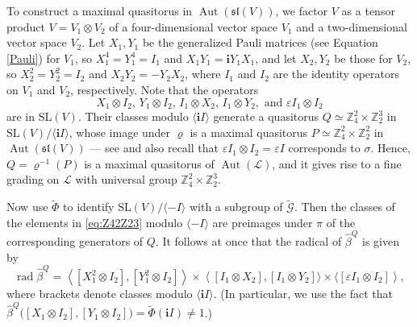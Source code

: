 \documentclass[a4paper,reqno]{amsart}
\theoremstyle{definition}
\numberwithin{theorem}{section}
\numberwithin{equation}{section}
\begin{document}
To construct a maximal quasitorus in $\operatorname{\mathrm{Aut}}({{\mathfrak{sl}}}(V))$, we factor $V$ as a tensor product $V=V_1\otimes V_2$ of a four-dimensional vector space $V_1$ and a two-dimensional vector space $V_2$. Let $X_1,Y_1$ be the generalized Pauli matrices (see Equation \eqref{Pauli}) for $V_1$, so $X_1^4=Y_1^4=I_1$ and $X_1Y_1={\mathbf{i}} Y_1X_1$, and let $X_2,Y_2$ be those for $V_2$, so $X_2^2=Y_2^2=I_2$ and $X_2Y_2=-Y_2X_2$, where $I_1$ and $I_2$ are the identity operators on $V_1$ and $V_2$, respectively. Note that the operators
\begin{equation}\label{eq:Z42Z23}
X_1\otimes I_2,\, Y_1\otimes I_2,\, I_1\otimes X_2,\, I_1\otimes Y_2,\text{ and }{\varepsilon} I_1\otimes I_2
\end{equation}
are in ${\mathrm{SL}}(V)$. Their classes modulo $\langle {\mathbf{i}} I\rangle$ generate a quasitorus $Q\simeq {\mathbb{Z}}_4^2\times{\mathbb{Z}}_2^3$ in ${\mathrm{SL}}(V)/\langle {\mathbf{i}} I\rangle$, whose image under $\varrho$ is a maximal quasitorus $P\simeq{\mathbb{Z}}_4^2\times{\mathbb{Z}}_2^2$ in $\operatorname{\mathrm{Aut}}({{\mathfrak{sl}}}(V))$ --- see \cite[\S 3.3]{EK_mon} and also recall that ${\varepsilon} I_1\otimes I_2={\varepsilon} I$ corresponds to $\sigma$. Hence, $Q=\varrho^{-1}(P)$ is a maximal quasitorus of $\operatorname{\mathrm{Aut}}({\mathcal{L}})$, and it gives rise to a fine grading on ${\mathcal{L}}$ with universal group ${\mathbb{Z}}_4^2\times{\mathbb{Z}}_2^3$. 

Now use $\tilde\Phi$ to identify ${\mathrm{SL}}(V)/\langle -I\rangle$ with a subgroup of $\tilde{\mathcal{G}}$. Then the classes of the elements in \eqref{eq:Z42Z23} modulo $\langle -I\rangle$ are preimages under $\pi$ of the corresponding generators of $Q$. It follows at once that the radical of $\hat\beta^Q$ is given by
\begin{equation}\label{eq:kerbZ42Z23}
\operatorname{\mathrm{rad}}\hat\beta^Q=\left\langle [X_1^2\otimes I_2],[Y_1^2\otimes I_2]\right\rangle\times\left\langle [I_1\otimes X_2],[I_1\otimes Y_2]\rangle\times\langle [{\varepsilon} I_1\otimes I_2]\right\rangle,
\end{equation}
where brackets denote classes modulo $\langle {\mathbf{i}} I\rangle$. 
(In particular, we use the fact that $\hat\beta^Q\bigl([X_1\otimes I_2],[Y_1\otimes I_2]\bigr)=\tilde\Phi({\mathbf{i}} I)\ne 1$.)
\end{document}
